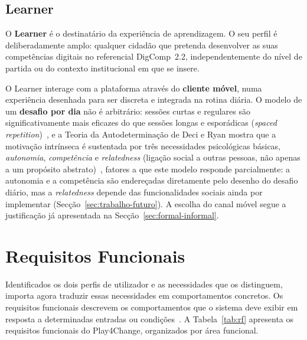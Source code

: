 \subsection{Learner}

O \textbf{Learner} é o destinatário da experiência de aprendizagem. O seu perfil é deliberadamente amplo: qualquer cidadão que pretenda desenvolver as suas competências digitais no referencial DigComp~2.2, independentemente do nível de partida ou do contexto institucional em que se insere.

O Learner interage com a plataforma através do \textbf{cliente móvel}, numa experiência desenhada para ser discreta e integrada na rotina diária. O modelo de um \textbf{desafio por dia} não é arbitrário: sessões curtas e regulares são significativamente mais eficazes do que sessões longas e esporádicas (\textit{spaced repetition})~\cite{ebbinghaus1885,cepeda2006}, e a Teoria da Autodeterminação de Deci e Ryan mostra que a motivação intrínseca é sustentada por três necessidades psicológicas básicas, \textit{autonomia}, \textit{competência} e \textit{relatedness} (ligação social a outras pessoas, não apenas a um propósito abstrato)~\cite{deci2000}, fatores a que este modelo responde parcialmente: a autonomia e a competência são endereçadas diretamente pelo desenho do desafio diário, mas a \textit{relatedness} depende das funcionalidades sociais ainda por implementar (Secção~\ref{sec:trabalho-futuro}). A escolha do canal móvel segue a justificação já apresentada na Secção~\ref{sec:formal-informal}.

\section{Requisitos Funcionais} \label{sec:rf}

Identificados os dois perfis de utilizador e as necessidades que os distinguem, importa agora traduzir essas necessidades em comportamentos concretos. Os requisitos funcionais descrevem os comportamentos que o sistema deve exibir em resposta a determinadas entradas ou condições~\cite{sommerville2016}.
A Tabela~\ref{tab:rf} apresenta os requisitos funcionais do Play4Change, organizados por área funcional.

